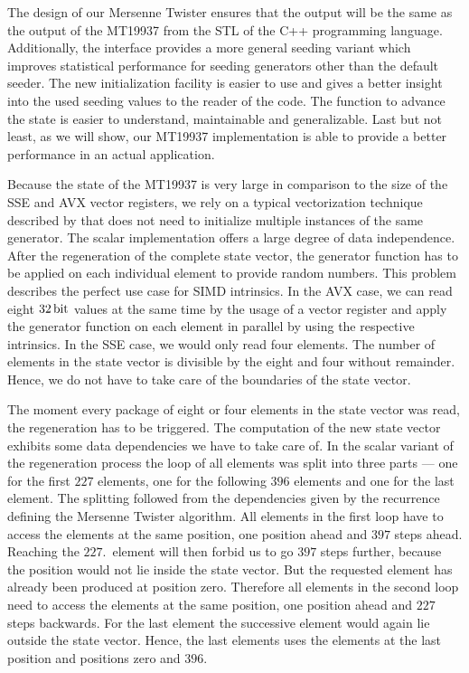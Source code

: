 \documentclass{stdlocal}
\begin{document}
    The design of our Mersenne Twister ensures that the output will be the same as the output of the MT19937 from the STL of the C++ programming language.
    Additionally, the interface provides a more general seeding variant which improves statistical performance for seeding generators other than the default seeder.
    The new initialization facility is easier to use and gives a better {}insight into the used seeding values to the reader of the code.
    The function to advance the state is easier to understand, maintainable and generalizable.
    Last but not least, as we will show, our MT19937 implementation is able to provide a better performance in an actual application.

    Because the state of the MT19937 is very large in comparison to the size of the SSE and AVX vector registers, we rely on a typical vectorization technique described by \textcite{fog2015} that does not need to initialize multiple instances of the same generator.
    The scalar implementation offers a large degree of data independence.
    After the regeneration of the complete state vector, the generator function has to be applied on each individual element to provide random numbers.
    This problem describes the perfect use case for SIMD intrinsics.
    In the AVX case, we can read eight $32\, \mathrm{bit}$ values at the same time by the usage of a vector register and apply the generator function on each element in parallel by using the respective intrinsics.
    In the SSE case, we would only read four elements.
    The number of elements in the state vector is divisible by the eight and four without remainder.
    Hence, we do not have to take care of the boundaries of the state vector.

    The moment every package of eight or four elements in the state vector was read, the regeneration has to be triggered.
    The computation of the new state vector exhibits some data dependencies we have to take care of.
    In the scalar variant of the regeneration process the loop of all elements was split into three parts --- one for the first $227$ elements, one for the following $396$ elements and one for the last element.
    The splitting followed from the dependencies given by the recurrence defining the Mersenne Twister algorithm.
    All elements in the first loop have to access the elements at the same position, one position ahead and $397$ steps ahead.
    Reaching the $227$.~element will then forbid us to go $397$ steps further, because the position would not lie inside the state vector.
    But the requested element has already been produced at position zero.
    Therefore all elements in the second loop need to access the elements at the same position, one position ahead and $227$ steps backwards.
    For the last element the successive element would again lie outside the state vector.
    Hence, the last elements uses the elements at the last position and positions zero and $396$.
\end{document}
